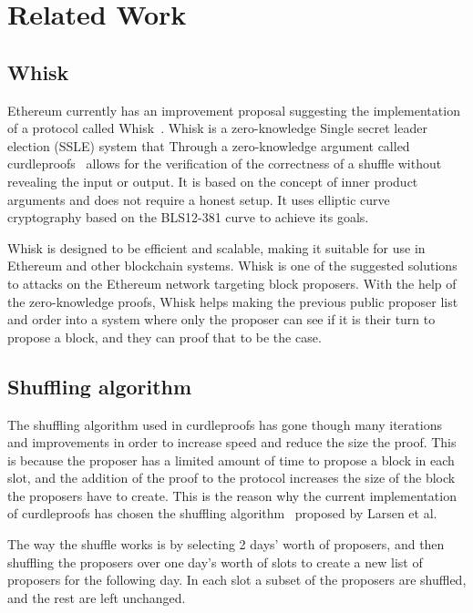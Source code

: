 \section{Related Work}\label{sec:related-work}




\subsection{Whisk}\label{sec:related-work-whisk}
Ethereum currently has an improvement proposal suggesting the implementation of a protocol called Whisk~\cite{Whisk2024}.
Whisk is a zero-knowledge Single secret leader election (SSLE) system that Through a zero-knowledge argument called curdleproofs~\cite{Curdleproofs} allows for the verification of the correctness of a shuffle without revealing the input or output.
It is based on the concept of inner product arguments and does not require a honest setup.
It uses elliptic curve cryptography based on the BLS12-381 curve to achieve its goals.

Whisk is designed to be efficient and scalable, making it suitable for use in Ethereum and other blockchain systems.
Whisk is one of the suggested solutions to attacks on the Ethereum network targeting block proposers.
With the help of the zero-knowledge proofs, Whisk helps making the previous public proposer list and order into a system where only the proposer can see if it is their turn to propose a block, and they can proof that to be the case.



\subsection{Shuffling algorithm}\label{sec:related-work-Shuffling-algorithm}
The shuffling algorithm used in curdleproofs has gone though many iterations and improvements in order to increase speed and reduce the size the proof.
This is because the proposer has a limited amount of time to propose a block in each slot, and the addition of the proof to the protocol increases the size of the block the proposers have to create.
This is the reason why the current implementation of curdleproofs has chosen the shuffling algorithm~\cite{cryptoeprint:2022/560} proposed by Larsen et al.

The way the shuffle works is by selecting 2 days' worth of proposers, and then shuffling the proposers over one day's worth of slots to create a new list of proposers for the following day.
In each slot a subset of the proposers are shuffled, and the rest are left unchanged.

